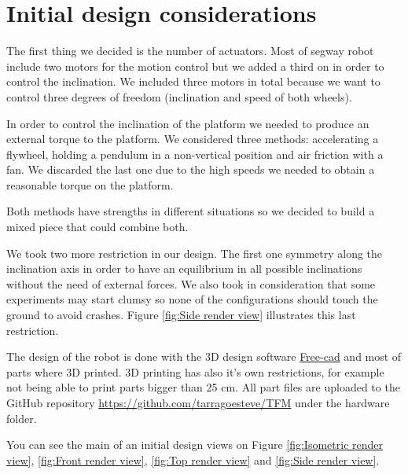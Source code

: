 \section{Initial design considerations}
The first thing we decided is the number of actuators.
Most of segway robot include two motors for the motion control but
we added a third on in order to control the inclination.
We included three motors in total because we want to control
three degrees of freedom (inclination and speed of both wheels).

In order to control the inclination of the platform we needed to produce
an external torque to the platform. We considered three methods: accelerating
a flywheel, holding a pendulum in a non-vertical position and air friction
with a fan. We discarded the last one due to the high speeds we needed to obtain
a reasonable torque on the platform.

Both methods have strengths in different situations so we decided to build a mixed
piece that could combine both. 


We took two more restriction in our design. The first one symmetry along the 
inclination axis in order to have an equilibrium in all possible inclinations
without the need of external forces. 
We also took in consideration that some experiments may start clumsy so none of
the configurations should touch the ground to avoid crashes. Figure \ref{fig:Side render view}
illustrates this last restriction.   

The design of the robot is done with the 3D design software 
\href{https://www.freecadweb.org/}{Free-cad} and most of parts where 3D printed. 3D printing has
also it's own restrictions, for example not being able to print parts bigger than 25 cm.
All part files are uploaded to the GitHub repository \url{https://github.com/tarragoesteve/TFM} under the hardware folder.

You can see the main of an initial design views on Figure \ref{fig:Isometric render view}, \ref{fig:Front render view}, \ref{fig:Top render view} and \ref{fig:Side render view}.

